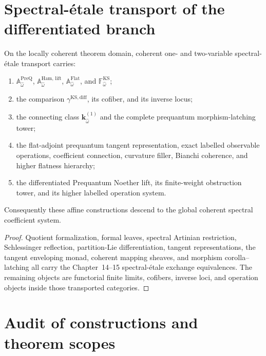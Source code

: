 \section{Spectral-\'etale transport of the differentiated branch}
\label{sec:prequantum-spectral-etale-differentiated}

\begin{theorem}
\label{thm:prequantum-spectral-etale-transport-differentiated}
On the locally coherent theorem domain, coherent one- and two-variable
spectral-\'etale transport carries:
\begin{enumerate}
\item $\mathbb A_{\widehat\omega}^{\mathrm{PreQ}}$,
      $\mathbb A_{\widehat\omega}^{\mathrm{Ham,\,lift}}$,
      $\mathbb A_{\widehat\omega}^{\mathrm{Flat}}$, and
      $\mathbb F_{\widehat\omega}^{\mathrm{KS}}$;
\item the comparison $\gamma^{\mathrm{KS,diff}}$, its cofiber, and its inverse
      locus;
\item the connecting class $\mathbf k_{\widehat\omega}^{(1)}$ and the complete
      prequantum morphism-latching tower;
\item the flat-adjoint prequantum tangent representation, exact labelled observable operations,
      coefficient connection, curvature filler, Bianchi coherence, and higher
      flatness hierarchy;
\item the differentiated Prequantum Noether lift, its finite-weight obstruction
      tower, and its higher labelled operation system.
\end{enumerate}
Consequently these affine constructions descend to the global coherent spectral
coefficient system.
\end{theorem}

\begin{proof}
Quotient formalization, formal leaves, spectral Artinian restriction, Schlessinger
reflection, partition-Lie differentiation, tangent representations, the tangent
enveloping monad, coherent mapping sheaves, and morphism corolla--latching all
carry the Chapter~14--15 spectral-\'etale exchange equivalences.  The remaining
objects are functorial finite limits, cofibers, inverse loci, and operation objects
inside those transported categories.
\end{proof}


\section{Audit of constructions and theorem scopes}
\label{sec:prequantum-audit-constructions-theorem-scopes}

